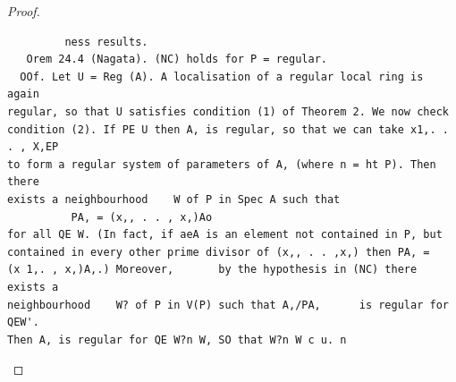 \begin{proof}
\begin{verbatim}
         ness results.
   Orem 24.4 (Nagata). (NC) holds for P = regular.
  OOf. Let U = Reg (A). A localisation of a regular local ring is again
regular, so that U satisfies condition (1) of Theorem 2. We now check
condition (2). If PE U then A, is regular, so that we can take x1,. . . , X,EP
to form a regular system of parameters of A, (where n = ht P). Then there
exists a neighbourhood    W of P in Spec A such that
          PA, = (x,, . . , x,)Ao
for all QE W. (In fact, if aeA is an element not contained in P, but
contained in every other prime divisor of (x,, . . ,x,) then PA, =
(x 1,. , x,)A,.) Moreover,       by the hypothesis in (NC) there exists a
neighbourhood    W? of P in V(P) such that A,/PA,      is regular for QEW'.
Then A, is regular for QE W?n W, SO that W?n W c u. n
\end{verbatim}
\end{proof}


